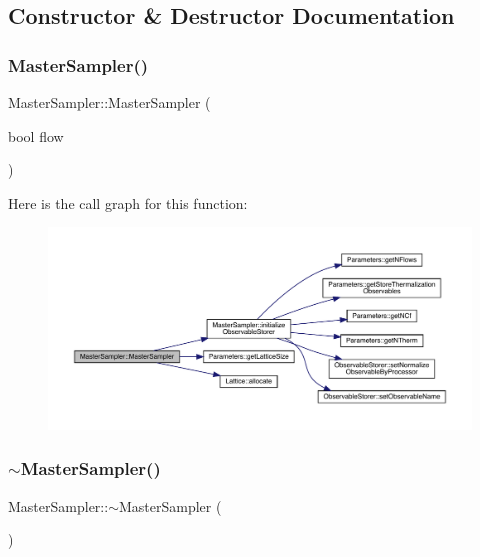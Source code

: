 \subsection{Constructor \& Destructor Documentation}
\mbox{\label{class_master_sampler_ac5ee503e8391aca36f73872a45bb6bd9}} 
\subsubsection{\texorpdfstring{MasterSampler()}{MasterSampler()}}
{\footnotesize\ttfamily Master\+Sampler\+::\+Master\+Sampler (\begin{DoxyParamCaption}\item[{bool}]{flow }\end{DoxyParamCaption})}

Here is the call graph for this function\+:\nopagebreak
\begin{figure}[H]
\begin{center}
\leavevmode
\includegraphics[width=350pt]{class_master_sampler_ac5ee503e8391aca36f73872a45bb6bd9_cgraph}
\end{center}
\end{figure}
\mbox{\label{class_master_sampler_a040e460a888f8dc066de84563f83caa6}} 
\subsubsection{\texorpdfstring{$\sim$MasterSampler()}{~MasterSampler()}}
{\footnotesize\ttfamily Master\+Sampler\+::$\sim$\+Master\+Sampler (\begin{DoxyParamCaption}{ }\end{DoxyParamCaption})}



